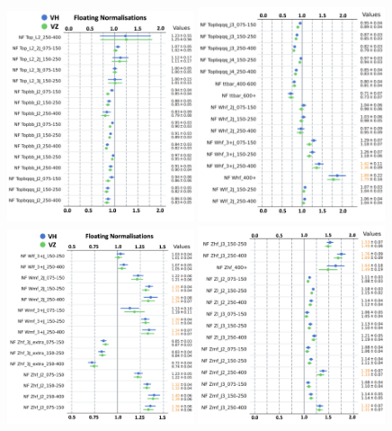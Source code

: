 \begin{figure}[h!]
    \centering
    \includegraphics[width=0.49\textwidth]{Images/VH/Fit/fromSlides/FN/FN1.png}
    \includegraphics[width=0.49\textwidth]{Images/VH/Fit/fromSlides/FN/FN2.png}\\
    \includegraphics[width=0.49\textwidth]{Images/VH/Fit/fromSlides/FN/FN3.png}
    \includegraphics[width=0.49\textwidth]{Images/VH/Fit/fromSlides/FN/FN4.png}

\end{figure}
